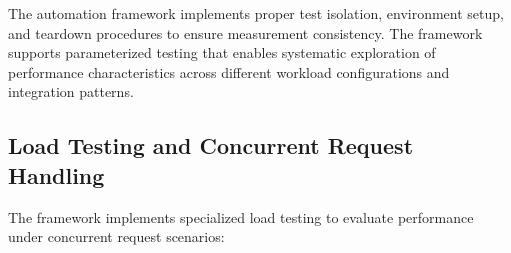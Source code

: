 The automation framework implements proper test isolation, environment setup, and teardown procedures to ensure measurement consistency. The framework supports parameterized testing that enables systematic exploration of performance characteristics across different workload configurations and integration patterns.

\subsection{Load Testing and Concurrent Request Handling}

The framework implements specialized load testing to evaluate performance under concurrent request scenarios:




    
        
        
                
                
                    
